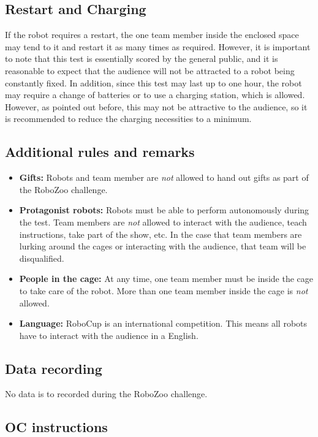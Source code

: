\subsection{Restart and Charging}
If the robot requires a restart, the one team member inside the enclosed space may tend to it and restart it as many times as required. 
However, it is important to note that this test is essentially scored by the general public, and it is reasonable to expect that the audience will not be attracted to a robot being constantly fixed. 
In addition, since this test may last up to one hour, the robot may require a change of batteries or to use a charging station, which is allowed. 
However, as pointed out before, this may not be attractive to the audience, so it is recommended to reduce the charging necessities to a minimum. 

\subsection{Additional rules and remarks}

\begin{itemize}
\item \textbf{Gifts:} Robots and team member are \emph{not} allowed to hand out gifts as part of the RoboZoo challenge. 
\item \textbf{Protagonist robots:} Robots must be able to perform autonomously during the test. 
Team members are \emph{not} allowed to interact with the audience, teach instructions, take part of the show, etc. 
In the case that team members are lurking around the cages or interacting with the audience, that team will be disqualified.
\item \textbf{People in the cage:} At any time, one team member must be inside the cage to take care of the robot. 
More than one team member inside the cage is \emph{not} allowed.
\item \textbf{Language:} RoboCup is an international competition. This means all robots have to interact with the audience in a English. 
\end{itemize}

\subsection{Data recording}
  No data is to recorded during the RoboZoo challenge.

\subsection{OC instructions}

